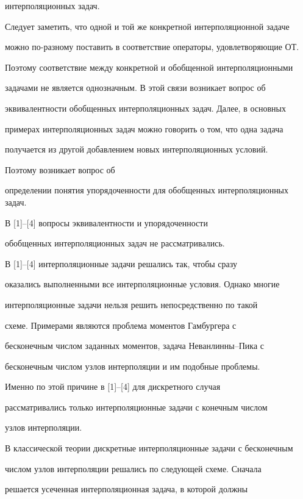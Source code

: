 интерполяционных задач.





Следует заметить, что одной и той же конкретной интерполяционной задаче


можно по-разному поставить в соответствие операторы, удовлетворяющие ОТ.


Поэтому соответствие между конкретной и обобщенной интерполяционными


задачами не является однозначным. В этой связи возникает вопрос об


эквивалентности обобщенных интерполяционных задач. Далее, в основных


примерах интерполяционных задач можно говорить о том, что одна задача


получается из другой добавлением новых интерполяционных условий.


Поэтому возникает вопрос об


определении понятия упорядоченности для обобщенных интерполяционных задач.


В [1]--[4] вопросы эквивалентности и упорядоченности


обобщенных интерполяционных задач не рассматривались.





В [1]--[4] интерполяционные задачи решались так, чтобы сразу


оказались выполненными все интерполяционные условия. Однако многие


интерполяционные задачи нельзя решить непосредственно по такой


схеме. Примерами являются проблема моментов Гамбургера с


бесконечным числом заданных моментов, задача Неванлинны--Пика с


бесконечным числом узлов интерполяции и им подобные проблемы.


Именно по этой причине в [1]--[4] для дискретного случая


рассматривались только интерполяционные задачи с конечным числом


узлов интерполяции.





В классической теории дискретные интерполяционные задачи с бесконечным


числом узлов интерполяции решались по следующей схеме. Сначала


решается усеченная интерполяционная задача, в которой должны


